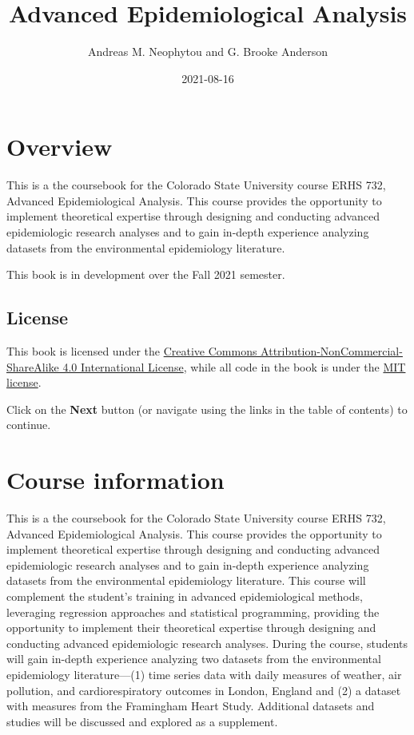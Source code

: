 \documentclass[
]{book}
\title{Advanced Epidemiological Analysis}
\author{Andreas M. Neophytou and G. Brooke Anderson}
\date{2021-08-16}
\begin{document}
\maketitle

{
\setcounter{tocdepth}{1}
\tableofcontents
}
\hypertarget{overview}{%
\chapter{Overview}\label{overview}}

This is a the coursebook for the Colorado State University course ERHS 732,
Advanced Epidemiological Analysis. This course provides the opportunity to
implement theoretical expertise through designing and conducting advanced
epidemiologic research analyses and to gain in-depth experience analyzing
datasets from the environmental epidemiology literature.

This book is in development over the Fall 2021 semester.

\hypertarget{license}{%
\section{License}\label{license}}

This book is licensed under the \href{https://creativecommons.org/licenses/by-nc-sa/4.0/}{Creative Commons
Attribution-NonCommercial-ShareAlike 4.0 International
License}, while all code in
the book is under the \href{https://opensource.org/licenses/MIT}{MIT license}.

Click on the \textbf{Next} button (or navigate using the links in the table of
contents) to continue.

\hypertarget{courseinfo}{%
\chapter{Course information}\label{courseinfo}}

This is a the coursebook for the Colorado State University course ERHS 732,
Advanced Epidemiological Analysis. This course provides the opportunity to
implement theoretical expertise through designing and conducting advanced
epidemiologic research analyses and to gain in-depth experience analyzing
datasets from the environmental epidemiology literature. This course will
complement the student's training in advanced epidemiological methods,
leveraging regression approaches and statistical programming, providing the
opportunity to implement their theoretical expertise through designing and
conducting advanced epidemiologic research analyses. During the course,
students will gain in-depth experience analyzing two datasets from the
environmental epidemiology literature---(1) time series data with daily measures
of weather, air pollution, and cardiorespiratory outcomes in London, England and
(2) a dataset with measures from the Framingham Heart Study. Additional datasets
and studies will be discussed and explored as a supplement.
\end{document}
